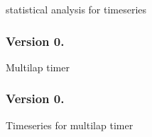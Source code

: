 \begin{DoxyItemize}
\item statistical analysis for timeseries
\end{DoxyItemize}

\subsubsection*{Version 0.}


\begin{DoxyItemize}
\item Multilap timer
\end{DoxyItemize}

\subsubsection*{Version 0.}


\begin{DoxyItemize}
\item Timeseries for multilap timer 
\end{DoxyItemize}